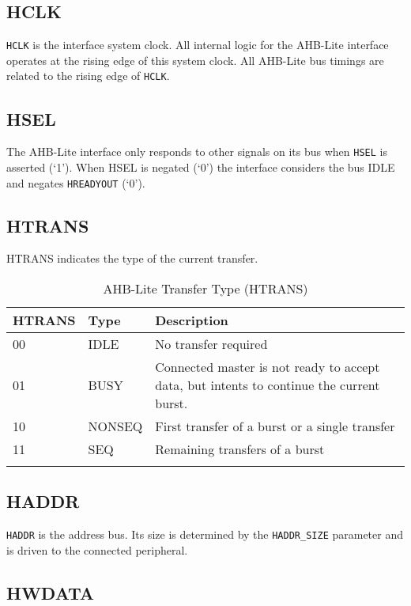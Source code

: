 \subsection{HCLK}\label{hclk}

\texttt{HCLK} is the interface system clock.
All internal logic for the AHB-Lite interface operates at the rising edge of this system clock.
All AHB-Lite bus timings are related to the rising edge of \texttt{HCLK}.

\subsection{HSEL}\label{hsel}

The AHB-Lite interface only responds to other signals on its bus when
\texttt{HSEL} is asserted (`1'). When HSEL is negated (`0') the interface
considers the bus IDLE and negates \texttt{HREADYOUT} (`0').

\pagebreak

\subsection{HTRANS}\label{htrans}

HTRANS indicates the type of the current transfer.

\begin{longtable}[]{@{}llp{11cm}@{}}
	\toprule
		HTRANS & Type   & Description\tabularnewline
	\midrule
	\endhead
		00     & IDLE   & No transfer required\tabularnewline
		01     & BUSY   & Connected master is not ready to accept data, but intents to continue the current burst.\tabularnewline
		10     & NONSEQ & First transfer of a burst or a single transfer\tabularnewline
		11     & SEQ    & Remaining transfers of a burst\tabularnewline
	\bottomrule
	\caption{AHB-Lite Transfer Type (HTRANS)}
\end{longtable}

\subsection{HADDR}\label{haddr}

\texttt{HADDR} is the address bus. Its size is determined by the \texttt{HADDR\_SIZE}
parameter and is driven to the connected peripheral.

\subsection{HWDATA}\label{hwdata}

